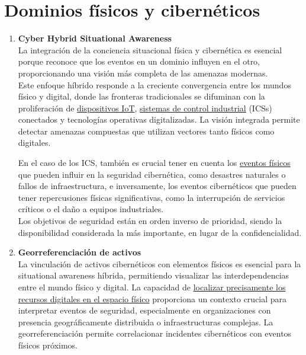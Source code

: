 \section{Dominios físicos y cibernéticos}
\begin{enumerate}[resume]
\item \textbf{Cyber Hybrid Situational Awareness} \\
La integración de la conciencia situacional física y cibernética es esencial porque reconoce que los eventos en un dominio influyen en el otro, proporcionando una visión más completa de las amenazas modernas.\\
Este enfoque híbrido responde a la creciente convergencia entre los mundos físico y digital, donde las fronteras tradicionales se difuminan con la proliferación de \ul{dispositivos IoT}, \ul{sistemas de control industrial} (ICSs) conectados y tecnologías operativas digitalizadas. 
La visión integrada permite detectar amenazas compuestas que utilizan vectores tanto físicos como digitales.

En el caso de los ICS, también es crucial tener en cuenta los \ul{eventos físicos} que pueden influir en la seguridad cibernética, como desastres naturales o fallos de infraestructura, e inversamente, los eventos cibernéticos que pueden tener repercusiones físicas significativas, como la interrupción de servicios críticos o el daño a equipos industriales.\\
Los objetivos de seguridad están en orden inverso de prioridad, siendo la disponibilidad considerada la más importante, en lugar de la confidencialidad.

\item \textbf{Georreferenciación de activos} \\
La vinculación de activos cibernéticos con elementos físicos es esencial para la situational awareness híbrida, permitiendo visualizar las interdependencias entre el mundo físico y digital. La capacidad de \ul{localizar precisamente los recursos digitales en el espacio físico} proporciona un contexto crucial para interpretar eventos de seguridad, especialmente en organizaciones con presencia geográficamente distribuida o infraestructuras complejas. La georreferenciación permite correlacionar incidentes cibernéticos con eventos físicos próximos.

\end{enumerate}


